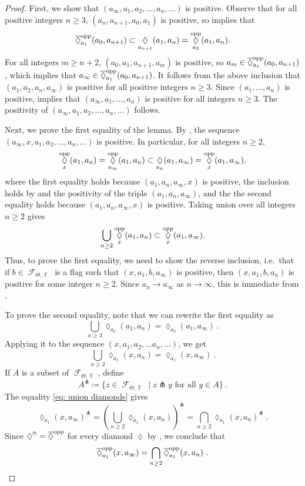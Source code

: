 \documentclass{amsart}
\theoremstyle{plain}
\theoremstyle{definition}
\DeclareMathOperator{\Diam}{\lozenge}
\DeclareMathOperator{\Fc}{\mathcal{F}}
\DeclareMathOperator{\Fb}{{\mathbb{F}}}
\newcommand{\opp}{\textnormal{opp}}
\newcommand{\1}{\mathbf{1}}
\begin{document}
\begin{proof}
First, we show that $(a_\infty,a_1,a_2,\dots,a_n,\dots)$ is positive. Observe that for all positive integers $n\ge 3$, $(a_n,a_{n+1},a_0,a_1)$ is positive, so  implies that  
\[\overline{\Diam}_{a_1}^{\rm opp}(a_0,a_{n+1})\subset\Diam_{a_{n+1}}(a_1,a_n)=\Diam_{a_2}^{\rm opp}(a_1,a_n).\]
For all integers $m\ge n+2$, $(a_0,a_1,a_{n+1},a_m)$ is positive, so $a_m\in \overline{\Diam}_{a_1}^{\rm opp}(a_0,a_{n+1})$, which implies that $a_\infty\in \overline{\Diam}_{a_1}^{\rm opp}(a_0,a_{n+1})$. It follows from the above inclusion that $(a_1,a_2,a_n,a_\infty)$ is positive for all positive integers $n\ge 3$. Since $(a_1,\dots,a_n)$ is positive,  implies that $(a_\infty,a_1,\dots,a_n)$ is positive for all integers $n\ge 3$. The positivity of  $(a_\infty,a_1,a_2,\dots,a_n,\dots)$ follows.


Next, we prove the first equality of the lemma. By , the sequence $(a_\infty,x,a_1,a_2,\dots,a_n,\dots)$ is positive. In particular, for all integers $n\ge 2$, 
\[\Diam_x^{\rm opp}(a_1,a_n)=\Diam_{a_\infty}^{\rm opp}(a_1,a_n)\subset\Diam_{a_n}(a_1,a_\infty)=\Diam_x^{\rm opp}(a_1,a_\infty),\]
where the first equality holds because $(a_1,a_n,a_\infty,x)$ is positive, the inclusion holds by  and the positivity of the triple $(a_1,a_n,a_\infty)$, and the the second equality holds because $(a_1,a_n,a_\infty,x)$ is positive. Taking union over all integers $n\ge 2$ gives
\[\bigcup_{n\geq 2} \Diam_x^\opp(a_1,a_n)\subset \Diam_x^\opp(a_1,a_\infty).\]
Thus, to prove the first equality, we need to show the reverse inclusion, i.e.\ that if $b\in\Fc_{\Theta,\Fb}$ is a flag such that $(x,a_1,b,a_\infty)$ is positive, then $(x,a_1,b,a_n)$ is positive for some integer $n\ge 2$. Since $a_n\to a_\infty$ as $n\to\infty$, this is immediate from . 

To prove the second equality, note that we can rewrite the first equality as
\[\bigcup_{n\geq 3} \Diam_{a_2}(a_1,a_n) = \Diam_{a_2}(a_1,a_\infty)~.\]
Applying it to the sequence $(x,a_1, a_2, \ldots a_n,\ldots)$, we get
\begin{equation} \label{eq: union diamonds}
    \bigcup_{n\geq 2} \Diam_{a_1}(x,a_n) = \Diam_{a_1}(x,a_\infty)~.
\end{equation}
If $A$ is a subset of $\Fc_{\Theta,\Fb}$, define
\[A^\pitchfork \coloneqq \{z\in \Fc_{\Theta,\Fb}\mid z\pitchfork y \textrm{ for all } y\in A\}~.\]
The equality \eqref{eq: union diamonds} gives
\[\Diam_{a_1}(x,a_\infty)^\pitchfork = \left(\bigcup_{n\geq 2} \Diam_{a_1}(x,a_n)\right)^\pitchfork = \bigcap_{n\geq 2} \Diam_{a_1}(x,a_n)^\pitchfork~.\]
Since $\Diam^\pitchfork = \overline{\Diam}^\opp$ for every diamond $\Diam$ by , we conclude that
\[\overline{\Diam}^\opp_{a_1}(x,a_\infty) = \bigcap_{n\geq 2} \overline{\Diam}^\opp_{a_1}(x,a_n)~.\]



\end{proof}
\end{document}
